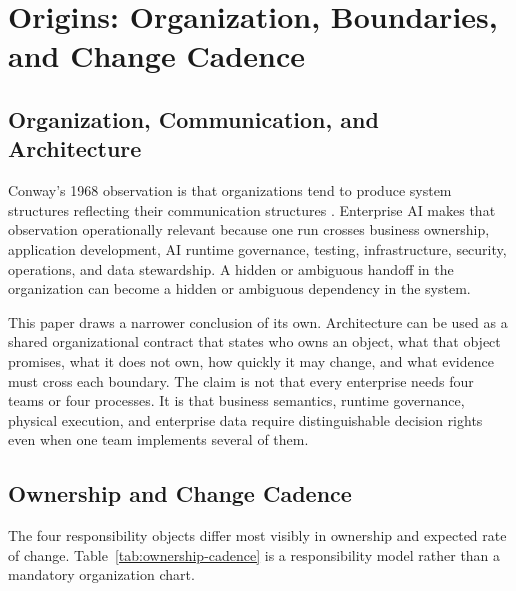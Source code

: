 \documentclass[11pt]{article}
\begin{document}
\section{Origins: Organization, Boundaries, and Change Cadence}
\label{sec:origins}

\subsection{Organization, Communication, and Architecture}

Conway's 1968 observation is that organizations tend to produce system structures reflecting their communication structures \cite{conway1968committees}. Enterprise AI makes that observation operationally relevant because one run crosses business ownership, application development, AI runtime governance, testing, infrastructure, security, operations, and data stewardship. A hidden or ambiguous handoff in the organization can become a hidden or ambiguous dependency in the system.

This paper draws a narrower conclusion of its own. Architecture can be used as a shared organizational contract that states who owns an object, what that object promises, what it does not own, how quickly it may change, and what evidence must cross each boundary. The claim is not that every enterprise needs four teams or four processes. It is that business semantics, runtime governance, physical execution, and enterprise data require distinguishable decision rights even when one team implements several of them.

\subsection{Ownership and Change Cadence}

The four responsibility objects differ most visibly in ownership and expected rate of change. Table~\ref{tab:ownership-cadence} is a responsibility model rather than a mandatory organization chart.
\end{document}
